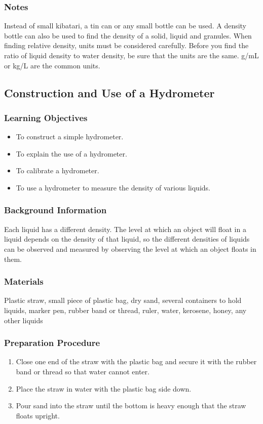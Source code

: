 \subsubsection*{Notes}
Instead of small kibatari, a tin can or any small bottle can be used.  A density bottle can also be used to find the density of a solid, liquid and granules.
When finding relative density, units must be considered carefully.  Before you find the ratio of liquid density to water density, be sure that the units are the same.  g/mL or kg/L are the common units.

\subsection{Construction and Use of a Hydrometer}

\subsubsection*{Learning Objectives}
\begin{itemize}
\item{To construct a simple hydrometer.} 
\item{To explain the use of a hydrometer.} 
\item{To calibrate a hydrometer.} 
\item{To use a hydrometer to measure the density of various liquids.} 
\end{itemize}

\subsubsection*{Background Information}
Each liquid has a different density. The level at which an object will float in a liquid depends on the density of that liquid, so the different densities of liquids can be observed and measured by observing the level at which an object floats in them.  

\subsubsection*{Materials}
Plastic straw, small piece of plastic bag, dry sand, several containers to hold liquids, marker pen, rubber band or thread, ruler, water, kerosene, honey, any other liquids

\subsubsection*{Preparation Procedure}
\begin{enumerate}
\item{Close one end of the straw with the plastic bag and secure it with the rubber band or thread so that water cannot enter.} 
\item{Place the straw in water with the plastic bag side down.} 
\item{Pour sand into the straw until the bottom is heavy enough that the straw floats upright.} 
\end{enumerate}

